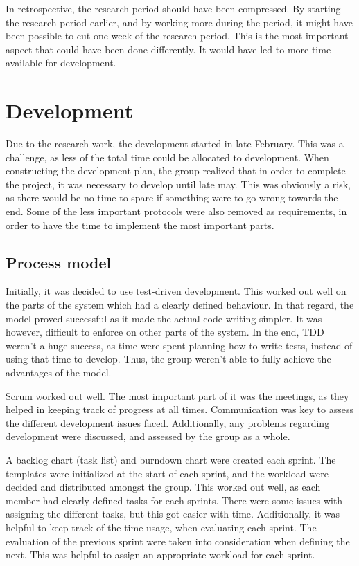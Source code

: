 In retrospective, the research period should have been compressed. By starting the research period earlier, and by working more during the period, it might have been possible to cut one week of the research period. This is the most important aspect that could have been done differently. It would have led to more time available for development.

\section{Development}
\label{sec:project_evaluation-development}

Due to the research work, the development started in late February. This was a challenge, as less of the total time could be allocated to development. When constructing the development plan, the group realized that in order to complete the project, it was necessary to develop until late may. This was obviously a risk, as there would be no time to spare if something were to go wrong towards the end. Some of the less important protocols were also removed as requirements, in order to have the time to implement the most important parts.

\subsection{Process model}
\label{subsec:project_evaluation-development-process_model}

Initially, it was decided to use test-driven development. This worked out well on the parts of the system which had a clearly defined behaviour. In that regard, the model proved successful as it made the actual code writing simpler. It was however, difficult to enforce on other parts of the system. In the end, TDD weren't a huge success, as time were spent planning how to write tests, instead of using that time to develop. Thus, the group weren't able to fully achieve the advantages of the model. 

Scrum worked out well. The most important part of it was the meetings, as they helped in keeping track of progress at all times. Communication was key to assess the different development issues faced. Additionally, any problems regarding development were discussed, and assessed by the group as a whole. 

A backlog chart (task list) and burndown chart were created each sprint. The templates were initialized at the start of each sprint, and the workload were decided and distributed amongst the group. This worked out well, as each member had clearly defined tasks for each sprints. There were some issues with assigning the different tasks, but this got easier with time. Additionally, it was helpful to keep track of the time usage, when evaluating each sprint. The evaluation of the previous sprint were taken into consideration when defining the next. This was helpful to assign an appropriate workload for each sprint.

